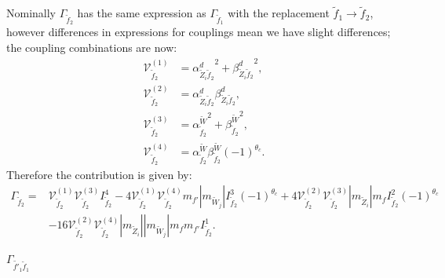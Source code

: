 \documentclass[final,3p,times,pdflatex]{elsarticle}
\begin{document}
Nominally $\Gamma_{\tilde{f}_2}$ has the same expression as $\Gamma_{\tilde{f}_1}$ with the replacement $\tilde{f}_1 \rightarrow
\tilde{f}_2$, however differences in expressions for couplings mean we have
slight differences; 
the coupling combinations are now:
\begin{align}
\mathcal{V}_{\tilde{f}_2}^{(1)} &= {\alpha_{\tilde{Z}_i \tilde{f}_2}^{d}}^2 + {\beta_{\tilde{Z}_i \tilde{f}_2}^{d}}^2, \\
\mathcal{V}_{\tilde{f}_2}^{(2)} &= {\alpha_{\tilde{Z}_i \tilde{f}_2}^{d}} {\beta_{\tilde{Z}_i \tilde{f}_2}^{d}}, \\
\mathcal{V}_{\tilde{f}_2}^{(3)} &= {\alpha_{\tilde{f}_2}^{\tilde{W}}}^2 + {\beta_{\tilde{f}_2}^{\tilde{W}}}^2, \\
\mathcal{V}_{\tilde{f}_2}^{(4)} &= \alpha_{\tilde{f}_2}^{\tilde{W}} \beta_{\tilde{f}_2}^{\tilde{W}}(-1)^{\theta_c}.
\end{align}
Therefore the contribution is given by:
\begin{equation}
\begin{aligned}
\Gamma_{\tilde{f}_2} = & \mathcal{V}_{\tilde{f}_2}^{(1)} \mathcal{V}_{\tilde{f}_2}^{(3)} I_{\tilde{f}_2}^{4} - 4 \mathcal{V}_{\tilde{f}_2}^{(1)} \mathcal{V}_{\tilde{f}_2}^{(4)} m_{f'} |m_{\tilde{W}_j}| I_{\tilde{f}_2}^{3} (-1)^{\theta_c}+ 4 \mathcal{V}_{\tilde{f}_2}^{(2)} \mathcal{V}_{\tilde{f}_2}^{(3)} |m_{\tilde{Z}_i}|m_{f} I_{\tilde{f}_2}^{2}(-1)^{\theta_c} \\ & - 16 \mathcal{V}_{\tilde{f}_2}^{(2)}  \mathcal{V}_{\tilde{f}_2}^{(4)} |m_{\tilde{Z}_i}||m_{\tilde{W}_j}|m_{f}m_{f'}I_{\tilde{f}_2}^{1}.
\end{aligned}
\end{equation}

\textbf{\underline{$\Gamma_{\tilde{f'}_1 \tilde{f}_1}$}}
\end{document}

